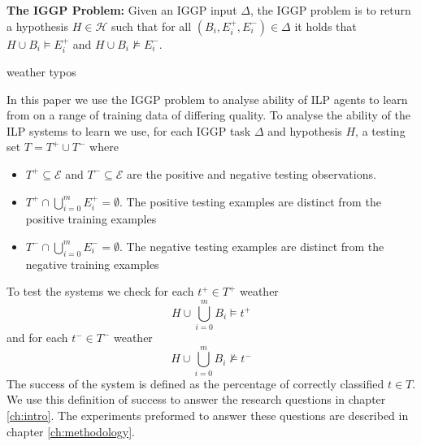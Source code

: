 \textbf{The IGGP Problem:} Given an IGGP input $\Delta$, the IGGP problem is to return a hypothesis $H \in \mathscr{H}$ such that for all $(B_i,E_i^+,E_i^-) \in \Delta$ it holds that $H \cup B_i \models E_i^+$ and
$H \cup B_i \not\models E_i^-$.

\ac{weather typos}

In this paper we use the IGGP problem to analyse ability of ILP agents to learn from on a range of training data of differing quality. To analyse the ability of the ILP systems to learn we use, for each IGGP task $\Delta$ and hypothesis $H$, a testing set $T = T^+\cup T^-$ where
\begin{itemize}
	\item $T^+ \subseteq \mathscr{E}$ and $T^-\subseteq \mathscr{E}$ are the positive and negative testing observations.
	\item $T^+ \cap \bigcup_{i=0}^m E_i^+  = \emptyset$. The positive testing examples are distinct from the positive training examples
	\item $T^- \cap \bigcup_{i=0}^m E_i^-  = \emptyset$. The negative testing examples are distinct from the negative training examples
\end{itemize}
To test the systems we check for each $t^+ \in T^+$ weather\[ H \cup \bigcup_{i=0}^m B_i \models t^+\] and for each $t^- \in T^-$  weather \[ H \cup \bigcup_{i=0}^m B_i \not\models t^-\]
The success of the system is defined as the percentage of correctly classified $t \in T$. We use this definition of success to answer the research questions in chapter \ref{ch:intro}. The experiments preformed to answer these questions are described in chapter \ref{ch:methodology}.


